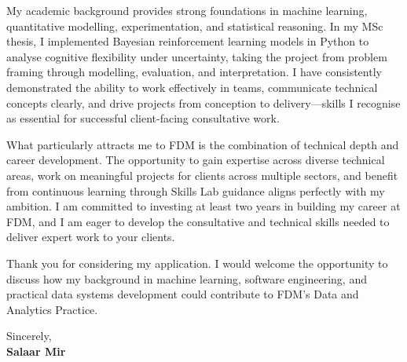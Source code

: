 \documentclass[a4paper,10pt]{article}
\begin{document}
My academic background provides strong foundations in machine learning, quantitative modelling, experimentation, and statistical reasoning. In my MSc thesis, I implemented Bayesian reinforcement learning models in Python to analyse cognitive flexibility under uncertainty, taking the project from problem framing through modelling, evaluation, and interpretation. I have consistently demonstrated the ability to work effectively in teams, communicate technical concepts clearly, and drive projects from conception to delivery---skills I recognise as essential for successful client-facing consultative work.

What particularly attracts me to FDM is the combination of technical depth and career development. The opportunity to gain expertise across diverse technical areas, work on meaningful projects for clients across multiple sectors, and benefit from continuous learning through Skills Lab guidance aligns perfectly with my ambition. I am committed to investing at least two years in building my career at FDM, and I am eager to develop the consultative and technical skills needed to deliver expert work to your clients.

Thank you for considering my application. I would welcome the opportunity to discuss how my background in machine learning, software engineering, and practical data systems development could contribute to FDM's Data and Analytics Practice.

\vspace{6mm}

Sincerely, \\
\textbf{Salaar Mir}
\end{document}
